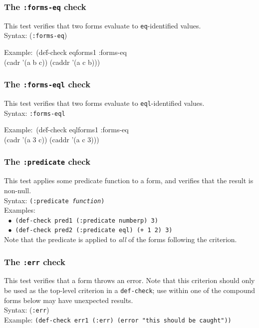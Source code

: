 \subsubsection{The \texttt{:forms-eq} check} 
This test verifies that two forms evaluate to \texttt{eq}-identified
values.
\\ Syntax: (\texttt{:forms-eq})
{\ttfamily\begin{tabbing}
\textrm{Example:}\ (de\=f-check eqforms1 :forms-eq
\\ \>  (cadr '(a b c)) (caddr '(a c b)))
\end{tabbing}}

\subsubsection{The \texttt{:forms-eql} check} 
This test verifies that two forms evaluate to \texttt{eql}-identified
values.
\\ Syntax: \texttt{:forms-eql}
{\ttfamily\begin{tabbing}
\textrm{Example:}\ (de\=f-check eqlforms1 :forms-eq
\\ \>  (cadr '(a 3 c)) (caddr '(a c 3)))
\end{tabbing}}

\subsubsection{The \texttt{:predicate} check} 
This test applies some predicate function to a form, and verifies that
the result is non-null.
\\ Syntax: \texttt{(:predicate \emph{function})}
\\ Examples:
\\ $~~\bullet$ \texttt{(def-check pred1 (:predicate numberp) 3)}
\\ $~~\bullet$ \texttt{(def-check pred2 (:predicate eql) (+ 1 2) 3)}
\\
Note that the predicate is applied to \emph{all} of the forms
following the criterion.

\subsubsection{The \texttt{:err} check} 
This test verifies that a form throws an error.  Note that this
criterion should only be used as the top-level criterion in a
\texttt{def-check}; use within one of the compound forms below may
have unexpected results.
\\ Syntax: (\texttt{:err})
\\ Example: \texttt{(def-check err1 (:err) (error "this should be caught"))}

